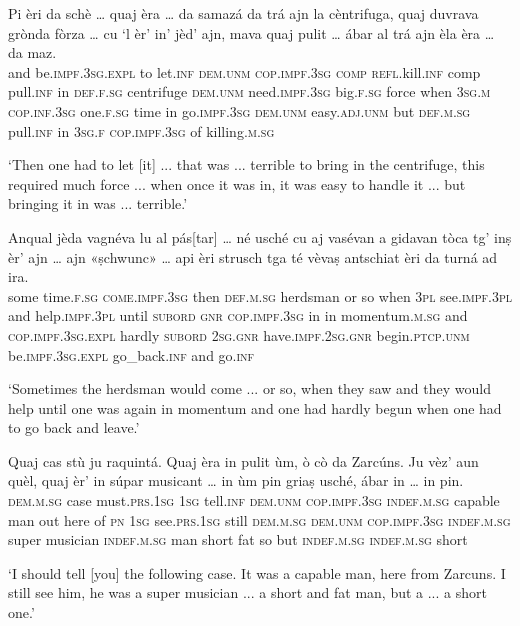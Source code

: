 \begin{linenumbers}
	\gll Pi èri da schè … quaj èra … da samazá da trá ajn la cèntrifuga, quaj duvrava grònda fòrza … cu `l èr’ in' jèd’ ajn\footnotemark, mava quaj pulit … ábar al trá ajn èla èra … da maz.   \\
	and be.\textsc{impf.3sg.expl} to let.\textsc{inf} {} \textsc{dem.unm} \textsc{cop.impf.3sg} {} \textsc{comp} \textsc{refl}.kill.\textsc{inf} comp pull.\textsc{inf} in \textsc{def.f.sg} centrifuge \textsc{dem.unm} need.\textsc{impf.3sg} big.\textsc{f.sg} force {} when \textsc{3sg.m} \textsc{cop.inf.3sg} one.\textsc{f.sg} time in go.\textsc{impf.3sg} \textsc{dem.unm} easy.\textsc{adj.unm} {} but \textsc{def.m.sg} pull.\textsc{inf} in \textsc{3sg.f} \textsc{cop.impf.3sg} {} of killing.\textsc{m.sg}\\
\end{linenumbers}
\medskip
\glt `Then one had to let [it] ... that was ... terrible to bring in the centrifuge, this required much force ... when once it was in, it was easy to handle it ... but bringing it in was ... terrible.'
\medskip

\begin{linenumbers}
	\gll  Anqual jèda vagnéva lu al pás[tar] … né usché cu aj vasévan a gidavan tòca tg’ inṣ èr’ ajn … ajn «ṣchwunc»\footnotemark{} …  api èri strusch tga té vèvaṣ antschiat èri da turná ad ira.\\
	some time.\textsc{f.sg} \textsc{come.impf.3sg} then \textsc{def.m.sg} herdsman {} or so when \textsc{3pl} see.\textsc{impf.3pl} and help.\textsc{impf.3pl} until \textsc{subord} \textsc{gnr} \textsc{cop.impf.3sg} in {} in momentum.\textsc{m.sg} {} and \textsc{cop.impf.3sg.expl} hardly \textsc{subord} \textsc{2sg.gnr} have.\textsc{impf.2sg.gnr} begin.\textsc{ptcp.unm} be.\textsc{impf.3sg.expl} \to go\_back.\textsc{inf} and go.\textsc{inf} \\
\end{linenumbers}
\medskip
\glt `Sometimes the herdsman would come ... or so, when they saw and they would help until one was again in momentum and one had hardly begun when one had to go back and leave.'
\medskip

\begin{linenumbers}
	\gll Quaj cas stù ju raquintá. Quaj èra in pulit ùm, ò cò da Zarcúns. Ju vèz’ aun quèl, quaj èr’ in súpar musicant … in ùm pin griaṣ usché, ábar in … in pin.\\
	\textsc{dem.m.sg} case must.\textsc{prs.1sg} \textsc{1sg} tell.\textsc{inf} \textsc{dem.unm} \textsc{cop.impf.3sg} \textsc{indef.m.sg} capable man out here of \textsc{pn} \textsc{1sg} see.\textsc{prs.1sg} still \textsc{dem.m.sg} \textsc{dem.unm} \textsc{cop.impf.3sg} \textsc{indef.m.sg} super musician {} \textsc{indef.m.sg} man short fat so but \textsc{indef.m.sg} {} \textsc{indef.m.sg} short\\
\end{linenumbers}
\medskip
\glt `I should tell [you] the following case. It was a capable man, here from Zarcuns. I still see him, he was a super musician ... a short and fat man, but a ... a short one.'
\medskip


